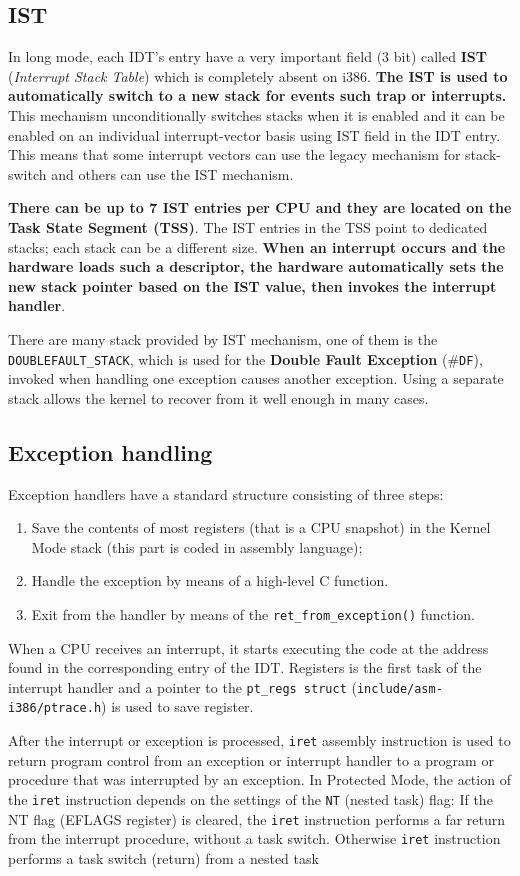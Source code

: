 \documentclass[10pt,a4paper]{article}
\begin{document}
\subsection{IST}

In long mode, each IDT's entry have a very important field (3 bit) called \textbf{IST} (\textit{Interrupt Stack Table}) which is completely absent on i386. \textbf{The IST is used to automatically switch to a new stack for events such trap or interrupts.} This mechanism unconditionally switches stacks when it is enabled and it can be enabled on an individual interrupt-vector basis using IST field in the IDT entry. This means that some interrupt vectors can use the legacy mechanism for stack-switch and others can use the IST mechanism.

\textbf{There can be up to 7 IST entries per CPU and they are located on the Task State Segment (TSS)}. The IST entries in the TSS point to dedicated stacks; each stack can be a different size. \textbf{When an interrupt occurs and the hardware loads such a descriptor, the hardware automatically sets the new stack pointer based on the IST value, then invokes the interrupt handler}.  

There are many stack provided by IST mechanism, one of them is the \texttt{DOUBLEFAULT\_STACK}, which is used for the \textbf{Double Fault Exception} (\#\texttt{DF}), invoked when handling one exception causes another exception. Using a separate stack allows the kernel to recover from it well enough in many cases.

\subsection{Exception handling}

Exception handlers have a standard structure consisting of three steps:
\begin{enumerate}
\item Save the contents of most registers (that is a CPU snapshot) in the Kernel Mode stack (this part is coded in assembly language);
\item Handle the exception by means of a high-level C function.
\item Exit from the handler by means of the \texttt{ret\_from\_exception()} function.
\end{enumerate}

When a CPU receives an interrupt, it starts executing the code at the address found in the corresponding entry of the IDT. Registers is the first task of the interrupt handler and a pointer to the \texttt{pt\_regs struct} (\texttt{include/asm-i386/ptrace.h}) is used to save register.

After the interrupt or exception is processed, \texttt{iret} assembly instruction is used to return program control from an exception or interrupt handler to a program or procedure that was interrupted by an exception. In Protected Mode, the action of the \texttt{iret} instruction depends on the settings of the \texttt{NT} (nested task) flag:
If the NT flag (EFLAGS register) is cleared, the \texttt{iret} instruction performs a far return from the interrupt procedure, without a task switch. Otherwise \texttt{iret} instruction performs a task switch (return) from a nested task
\end{document}

